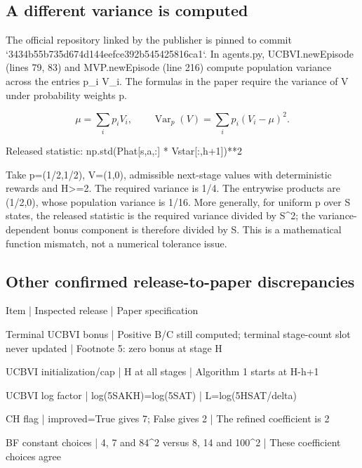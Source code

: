 \documentclass[10pt]{article}
\begin{document}
\subsection*{A different variance is computed}
The official repository linked by the publisher is pinned to commit `3434b55b735d674d144eefce392b545425816ca1`. In agents.py, UCBVI.newEpisode (lines 79, 83) and MVP.newEpisode (line 216) compute population variance across the entries p\_i V\_i. The formulas in the paper require the variance of V under probability weights p.\par
\[\mu=\sum_i p_iV_i,\qquad \operatorname{Var}_{p}(V)=\sum_i p_i(V_i-\mu)^2.\]\par
{\ttfamily\footnotesize Released statistic: np.std(Phat[s,a,:] * Vstar[:,h+1])**2}\par
Take p=(1/2,1/2), V=(1,0), admissible next-stage values with deterministic rewards and H>=2. The required variance is 1/4. The entrywise products are (1/2,0), whose population variance is 1/16. More generally, for uniform p over S states, the released statistic is the required variance divided by S\textasciicircum{}2; the variance-dependent bonus component is therefore divided by S. This is a mathematical function mismatch, not a numerical tolerance issue.\par
\subsection*{Other confirmed release-to-paper discrepancies}
Item | Inspected release | Paper specification\par
Terminal UCBVI bonus | Positive B/C still computed; terminal stage-count slot never updated | Footnote 5: zero bonus at stage H\par
UCBVI initialization/cap | H at all stages | Algorithm 1 starts at H-h+1\par
UCBVI log factor | log(5SAKH)=log(5SAT) | L=log(5HSAT/delta)\par
CH flag | improved=True gives 7; False gives 2 | The refined coefficient is 2\par
BF constant choices | 4, 7 and 84\textasciicircum{}2 versus 8, 14 and 100\textasciicircum{}2 | These coefficient choices agree\par
\end{document}
